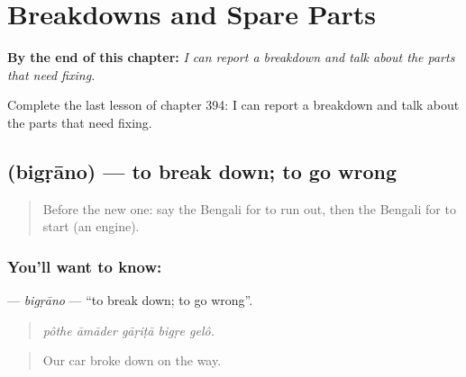 
\chapter{Breakdowns and Spare Parts}
\label{ch:bn-breakdowns-and-spare-parts}

\begin{chapteropening}
\textbf{By the end of this chapter:} \emph{I can report a breakdown and talk about the parts that need fixing.}

Complete the last lesson of chapter 394: I can report a breakdown and talk about the parts that need fixing.
\end{chapteropening}

\section[\texorpdfstring{\bn{বিগড়ানো} (bigṛāno)}{বিগড়ানো (bigṛāno)}]{ (bigṛāno) — to break down; to go wrong}

\label{lesson:BN-C394-bigrano}



\begin{quote}
Before the new one: say the Bengali for to run out, then the Bengali for to start (an engine).
\end{quote}

\subsection*{You'll want to know: }
\textbf{} — \emph{bigṛāno} — \textquotedblleft{}to break down; to go wrong\textquotedblright{}.

\begin{quote}
    
\end{quote}

\begin{quote}
\emph{pôthe āmāder gāṛiṭā bigṛe gelô.}
\end{quote}

\begin{quote}
Our car broke down on the way.
\end{quote}

